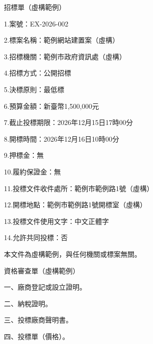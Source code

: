\documentclass[12pt]{article}
\begin{document}
\begin{center}\Large 招標單（虛構範例）\end{center}
\bigskip
1.案號：EX-2026-002\par
2.標案名稱：範例網站建置案（虛構）\par
3.招標機關：範例市政府資訊處（虛構）\par
4.招標方式：公開招標\par
5.決標原則：最低標\par
6.預算金額：新臺幣1,500,000元\par
7.截止投標期限：2026年12月15日17時00分\par
8.開標時間：2026年12月16日10時00分\par
9.押標金：無\par
10.履約保證金：無\par
11.投標文件收件處所：範例市範例路1號（虛構）\par
12.開標地點：範例市範例路1號開標室（虛構）\par
13.投標文件使用文字：中文正體字\par
14.允許共同投標：否\par
\bigskip
本文件為虛構範例，與任何機關或標案無關。
\clearpage
\begin{center}\Large 資格審查單（虛構範例）\end{center}
\bigskip
一、廠商登記或設立證明。\par
二、納稅證明。\par
三、投標廠商聲明書。\par
四、投標單（價格）。\par
\end{document}
